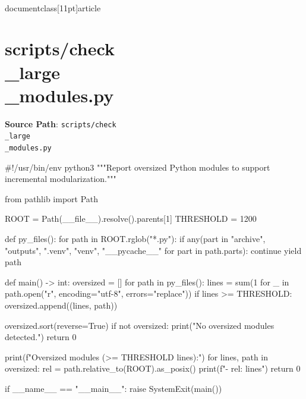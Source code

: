 \\documentclass[11pt]{article}
\begin{document}
\section*{scripts/check\\_large\\_modules.py}
\textbf{Source Path}: \texttt{scripts/check\\_large\\_modules.py}\par
\bigskip
\begin{CodeBlock}
#!/usr/bin/env python3
"""Report oversized Python modules to support incremental modularization."""

from pathlib import Path


ROOT = Path(__file__).resolve().parents[1]
THRESHOLD = 1200


def py_files():
    for path in ROOT.rglob("*.py"):
        if any(part in {"archive", "outputs", ".venv", "venv", "__pycache__"} for part in path.parts):
            continue
        yield path


def main() -> int:
    oversized = []
    for path in py_files():
        lines = sum(1 for _ in path.open("r", encoding="utf-8", errors="replace"))
        if lines >= THRESHOLD:
            oversized.append((lines, path))

    oversized.sort(reverse=True)
    if not oversized:
        print("No oversized modules detected.")
        return 0

    print(f"Oversized modules (>= {THRESHOLD} lines):")
    for lines, path in oversized:
        rel = path.relative_to(ROOT).as_posix()
        print(f"- {rel}: {lines}")
    return 0


if __name__ == "__main__":
    raise SystemExit(main())

\end{CodeBlock}
\end{document}
